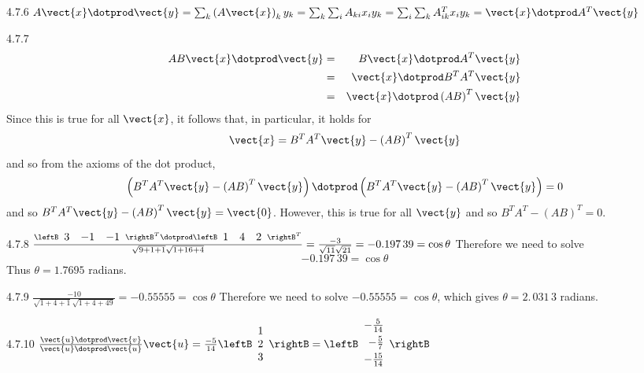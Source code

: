 \begin{Answer}{4.7.6}
$A\vect{x}\dotprod \vect{y}=\sum_{k}\left( A\vect{x}
\right) _{k}y_{k}=\sum_{k}\sum_{i}A_{ki}x_{i}y_{k}=\sum_{i}
\sum_{k}A_{ik}^{T}x_{i}y_{k}= \vect{x} \dotprod A^{T}\vect{y} $
\end{Answer}
\begin{Answer}{4.7.7}
\begin{eqnarray*}
 AB\vect{x} \dotprod \vect{y} &=& B\vect{x} \dotprod A^{T}\vect{y} \\
&=& \vect{x}\dotprod B^{T}A^{T}\vect{y} \\
&=& \vect{x}\dotprod \left( AB\right) ^{T} \vect{y}
\end{eqnarray*}
Since this is true for all $\vect{x}$, it follows that, in particular, it
holds for
\[
\vect{x}=B^{T}A^{T}\vect{y}-\left( AB\right) ^{T}\vect{y}
\]
and so from the axioms of the dot product,
\[
\left( B^{T}A^{T}\vect{y}-\left( AB\right) ^{T}\vect{y}\right) \dotprod \left(B^{T}A^{T}
\vect{y}-\left( AB\right) ^{T}\vect{y}\right) =0
\]
and so $B^{T}A^{T}\vect{y}-\left( AB\right) ^{T}\vect{y}=\vect{0}$. However,
this is true for all $\vect{y}$ and so $B^{T}A^{T}-\left(
AB\right) ^{T}=0.$
\end{Answer}
\begin{Answer}{4.7.8}
 $\frac{\leftB \begin{array}{ccc}
3 & -1 & -1
\end{array}
\rightB^T \dotprod
\leftB \begin{array}{ccc}
1 & 4 & 2
\end{array}
\rightB^T }{\sqrt{9+1+1}\sqrt{1+16+4}}= \frac{-3}{\sqrt{11}\sqrt{21}}= -0.197\,39=\cos \theta $
Therefore we need to solve
\[
-0.197\,39=\cos\theta
\]
Thus $\theta =1.7695$ radians.
\end{Answer}
\begin{Answer}{4.7.9}
 $\frac{-10}{\sqrt{1+4+1}\sqrt{1+4+49}}= -0.55555=\cos \theta $
Therefore we need to solve $-0.55555=\cos \theta $, which gives $\theta
=2.\,\allowbreak 031\,3$ radians.

\end{Answer}
\begin{Answer}{4.7.10}
$\frac{\vect{u}\dotprod \vect{v}}{\vect{u}\dotprod \vect{u}}\vect{u}=\frac{-5}{14}\leftB \begin{array}{r}
1 \\
2 \\
3
\end{array}
\rightB =\leftB
\begin{array}{r}
-\vspace{0.05in}\frac{5}{14} \\
-\vspace{0.05in}\frac{5}{7} \\
-\vspace{0.05in}\frac{15}{14}
\end{array}
\rightB $
\end{Answer}
